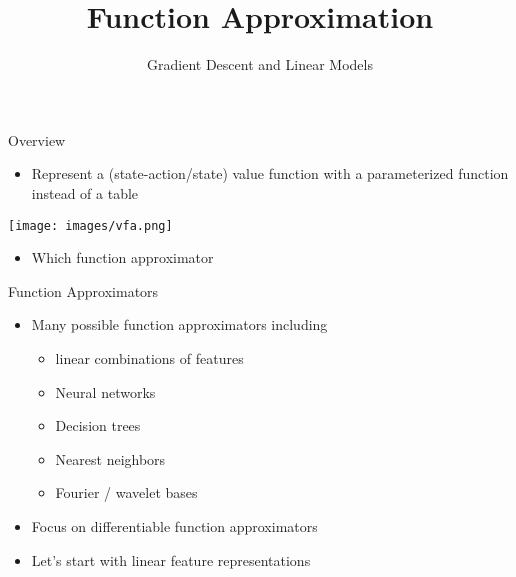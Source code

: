 \documentclass[aspectratio=169]{../latex_main/tntbeamer}  %
\title[RL: Function Approximation]{Function Approximation}
\subtitle{Gradient Descent and Linear Models}
\begin{document}
	
	\maketitle

\begin{frame}[c]{Overview}
	
	
\begin{itemize}
	\item Represent a (state-action/state) value function with a parameterized
	function instead of a table
\end{itemize}

\begin{center}
	\texttt{[image: images/vfa.png]}
\end{center}

\begin{itemize}
	\item \alert{Which function approximator}
\end{itemize}

\end{frame}
\begin{frame}[c]{Function Approximators}
	
	
	\begin{itemize}
		\item Many possible function approximators including
		\begin{itemize}
			\item linear combinations of features
			\item Neural networks
			\item Decision trees
			\item Nearest neighbors 
			\item Fourier / wavelet bases
		\end{itemize}
		\item Focus on differentiable function approximators
		\item Let's start with linear feature representations
	\end{itemize}
	
\end{frame}
\end{document}
